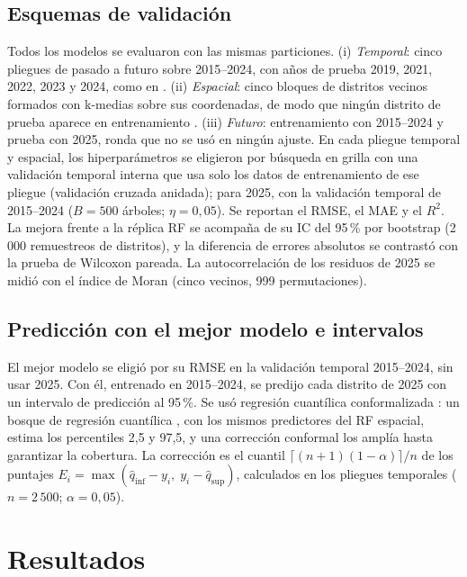 \documentclass[conference,letterpaper]{IEEEtran}
\begin{document}
\subsection{Esquemas de validación}
Todos los modelos se evaluaron con las mismas particiones. (i) \textit{Temporal}: cinco pliegues de pasado a futuro sobre 2015--2024, con años de prueba 2019, 2021, 2022, 2023 y 2024, como en \cite{tamayovera2025}. (ii) \textit{Espacial}: cinco bloques de distritos vecinos formados con k-medias sobre sus coordenadas, de modo que ningún distrito de prueba aparece en entrenamiento \cite{roberts2017,ploton2020}. (iii) \textit{Futuro}: entrenamiento con 2015--2024 y prueba con 2025, ronda que no se usó en ningún ajuste. En cada pliegue temporal y espacial, los hiperparámetros se eligieron por búsqueda en grilla con una validación temporal interna que usa solo los datos de entrenamiento de ese pliegue (validación cruzada anidada); para 2025, con la validación temporal de 2015--2024 ($B=500$ árboles; $\eta=0{,}05$). Se reportan el RMSE, el MAE y el $R^2$. La mejora frente a la réplica RF se acompaña de su IC del 95\,\% por bootstrap (2\,000 remuestreos de distritos), y la diferencia de errores absolutos se contrastó con la prueba de Wilcoxon pareada. La autocorrelación de los residuos de 2025 se midió con el índice de Moran (cinco vecinos, 999 permutaciones).

\subsection{Predicción con el mejor modelo e intervalos}
El mejor modelo se eligió por su RMSE en la validación temporal 2015--2024, sin usar 2025. Con él, entrenado en 2015--2024, se predijo cada distrito de 2025 con un intervalo de predicción al 95\,\%. Se usó regresión cuantílica conformalizada \cite{romano2019}: un bosque de regresión cuantílica \cite{meinshausen2006}, con los mismos predictores del RF espacial, estima los percentiles 2,5 y 97,5, y una corrección conformal \cite{lei2018,angelopoulos2023} los amplía hasta garantizar la cobertura. La corrección es el cuantil $\lceil (n+1)(1-\alpha) \rceil / n$ de los puntajes $E_i=\max(\hat q_{\mathrm{inf}}-y_i,\; y_i-\hat q_{\mathrm{sup}})$, calculados en los pliegues temporales ($n=2\,500$; $\alpha=0{,}05$).

\section{Resultados}
\end{document}
